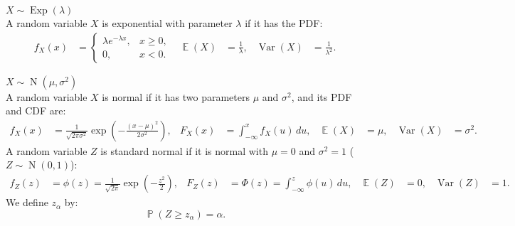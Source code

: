 \documentclass{huhtakm-template-book-v2}
\DeclareMathOperator{\prob}{\mathbb{P}}
\DeclareMathOperator{\E}{\mathbb{E}}
\DeclareMathOperator{\Var}{Var}
\DeclareMathOperator{\Exp}{Exp}
\DeclareMathOperator{\N}{N}
\begin{document}
    \begin{eg} $X \sim \Exp(\lambda)$\\
        A random variable $X$ is exponential with parameter $\lambda$ if it has the PDF:
        \begin{align*}
            f_{X}(x) &= \begin{cases}
                \lambda e^{-\lambda x}, &x \geq 0,\\
                0, &x < 0.
            \end{cases} & \E(X) &= \frac{1}{\lambda}, & \Var(X) &= \frac{1}{\lambda^{2}}.
        \end{align*}
    \end{eg}
    \begin{eg} $X \sim \N(\mu, \sigma^{2})$\\
        A random variable $X$ is normal if it has two parameters $\mu$ and $\sigma^{2}$, and its PDF and CDF are:
        \begin{align*}
            f_{X}(x) &= \frac{1}{\sqrt{2\pi\sigma^{2}}} \exp\left(-\frac{(x - \mu)^{2}}{2\sigma^{2}}\right), & F_{X}(x) &= \int_{-\infty}^{x} f_{X}(u) \, du, & \E(X) &= \mu, & \Var(X) &= \sigma^{2}.
        \end{align*}
        A random variable $Z$ is standard normal if it is normal with $\mu = 0$ and $\sigma^{2} = 1$ ($Z \sim \N(0, 1)$):
        \begin{align*}
            f_{Z}(z) &= \phi(z) = \frac{1}{\sqrt{2\pi}} \exp\left(-\frac{z^{2}}{2}\right), & F_{Z}(z) &= \Phi(z) = \int_{-\infty}^{z} \phi(u) \, du, & \E(Z) &= 0, & \Var(Z) &= 1.
        \end{align*}
        We define $z_{\alpha}$ by:
        \begin{equation*}
            \prob(Z \geq z_{\alpha}) = \alpha.
        \end{equation*}
    \end{eg}
    \newpage
\end{document}
